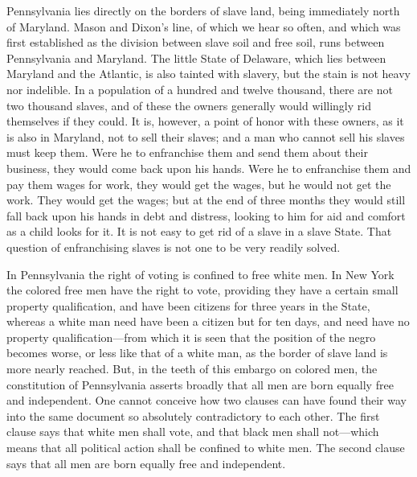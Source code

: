 Pennsylvania lies directly on the borders of slave land, being
immediately north of Maryland.  Mason and Dixon's line, of which we
hear so often, and which was first established as the division
between slave soil and free soil, runs between Pennsylvania and
Maryland.  The little State of Delaware, which lies between
Maryland and the Atlantic, is also tainted with slavery, but the
stain is not heavy nor indelible.  In a population of a hundred and
twelve thousand, there are not two thousand slaves, and of these
the owners generally would willingly rid themselves if they could.
It is, however, a point of honor with these owners, as it is also
in Maryland, not to sell their slaves; and a man who cannot sell
his slaves must keep them.  Were he to enfranchise them and send
them about their business, they would come back upon his hands.
Were he to enfranchise them and pay them wages for work, they would
get the wages, but he would not get the work.  They would get the
wages; but at the end of three months they would still fall back
upon his hands in debt and distress, looking to him for aid and
comfort as a child looks for it.  It is not easy to get rid of a
slave in a slave State.  That question of enfranchising slaves is
not one to be very readily solved.

In Pennsylvania the right of voting is confined to free white men.
In New York the colored free men have the right to vote, providing
they have a certain small property qualification, and have been
citizens for three years in the State, whereas a white man need
have been a citizen but for ten days, and need have no property
qualification---from which it is seen that the position of the negro
becomes worse, or less like that of a white man, as the border of
slave land is more nearly reached.  But, in the teeth of this
embargo on colored men, the constitution of Pennsylvania asserts
broadly that all men are born equally free and independent.  One
cannot conceive how two clauses can have found their way into the
same document so absolutely contradictory to each other.  The first
clause says that white men shall vote, and that black men shall
not---which means that all political action shall be confined to
white men.  The second clause says that all men are born equally
free and independent.

